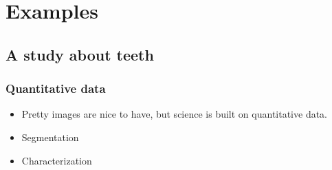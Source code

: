 \section{Examples}
\subsection{A study about teeth}
\begin{frame}
	\frametitle{Quantitative data}
	\begin{itemize}
		\item Pretty images are nice to have, but science is built on quantitative data.
		\item Segmentation
		\item Characterization
	\end{itemize}	
\end{frame}

